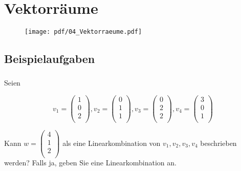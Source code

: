\section{Vektorräume}
\begin{figure}[h!]
    \texttt{[image: pdf/04\_Vektorraeume.pdf]}
\end{figure}
\newpage



\subsection{Beispielaufgaben} 

\vspace{1cm}

\subsubsection{} %
Seien

\begin{equation*}
    v_1 = 
    \begin{pmatrix}
    1\\
    0\\
    2\\
    \end{pmatrix}, v_2 =
    \begin{pmatrix}
    0\\
    1\\
    1\\
    \end{pmatrix}, v_3=
    \begin{pmatrix}
    0\\
    2\\
    2\\
    \end{pmatrix}, v_4=
    \begin{pmatrix}
    3\\
    0\\
    1\\
    \end{pmatrix}
\end{equation*}

Kann \( w = \begin{pmatrix} 4\\ 1\\ 2\\ \end{pmatrix} \) als eine Linearkombination von \( v_1,v_2,v_3,v_4 \) beschrieben werden? Falls ja, geben Sie eine Linearkombination an. 

